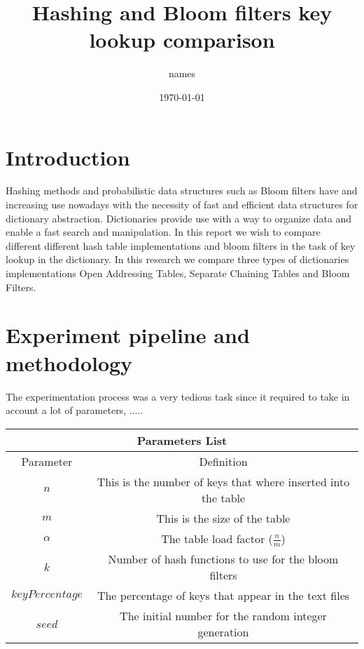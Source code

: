 \documentclass{article}
\title{Hashing and Bloom filters key lookup comparison}
\author{names}
\date{\today}
\begin{document}
    \maketitle
    \thispagestyle{empty}
    \begin{abstract}

    \end{abstract}


    \section{Introduction}
        Hashing methods and probabilistic data structures such as Bloom filters have and increasing use nowadays with the necessity of 
        fast and efficient data structures for dictionary abstraction. Dictionaries provide use with a way to organize data and enable 
        a fast search and manipulation. In this report we wish to compare different different hash table implementations and bloom filters 
        in the task of key lookup in the dictionary. In this research we compare three types of dictionaries implementations Open Addressing Tables, 
   	Separate Chaining Tables and Bloom Filters. 

    \section{Experiment pipeline and methodology}
    	The experimentation process was a very tedious task since it required to take in account a lot of parameters, 
    	.....
    	\begin{center}
	 \begin{tabular}{||c | c ||} 
	 \hline
	 \multicolumn{2}{|c|}{Parameters List} \\
	 \hline\hline 
	 Parameter & Definition \\
	\hline
	 $n$ & This is the number of keys that where inserted into the table \\
	 \hline
	 $m$ & This is the size of the table \\
	 \hline
	 $\alpha$ & The table load factor ($\frac{n}{m}$) \\
	 \hline
	 $k$ & Number of hash functions to use for the bloom filters \\
	 \hline
	 $keyPercentage$ & The percentage of keys that appear in the text files \\
	 \hline
	 $seed$ & The initial number for the random integer generation \\
	 \hline
	\end{tabular}
	\end{center}
\end{document}
